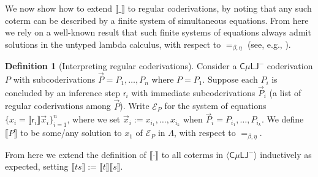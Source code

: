 \documentclass[10pt,a4paper]{amsart}
\theoremstyle{plain}
\newtheorem{lemma}[lemma]{Lemma}
\theoremstyle{definition}
\newtheorem{definition}[definition]{Definition}
\newcommand{\dfn}{:=}
\newcommand{\red}[1]{{\color{red}#1}}
\newcommand{\todonew}[1]{{\red{TodoNew: #1}}}
\renewcommand{\todonew}[1]{}
\theoremstyle{plain}
\theoremstyle{definition} %
\newcommand{\sem}[1]{\llbracket {#1} \rrbracket}
\newcommand{\closure}[1]{\langle #1 \rangle}
\newcommand{\Sys}[1]{\mathcal E_{#1}}
\newcommand{\infrule}{\mathsf{r}}
\newcommand{\rrule}{\infrule} %
\newcommand{\LJ}{\mathsf{LJ}}
\newcommand{\muLJ}{\mu\LJ}
\newcommand{\circular}{\mathsf C}
\newcommand{\cmuLJ}{\circular\muLJ}
\newcommand{\cmuLJneg}{\cmuLJ^-}
\newcommand{\rewrite}{\rightsquigarrow}
\newcommand{\reductionnorec}{\mathrm{r}'}
\newcommand{\reducesnorec}{\rewrite_{\reductionnorec}}
\newcommand{\betaeta}{=_{\beta, \eta}}
\newcommand{\der}{P}
\begin{document}
 We now show how to extend  $\sem{\_}$ to regular coderivations, by noting that any such coterm can be described by a finite system of simultaneous equations. 
 From here we rely on a well-known result that such finite systems of equations always admit solutions in the untyped lambda calculus, with respect to $\betaeta$ (see, e.g., \cite{Hindley}).

 \begin{definition}
 [Interpreting regular coderivations]
     Consider a $\cmuLJneg$ coderivation $P$ with subcoderivations $\vec P = P_1, \dots , P_n$ where $P = P_1$.
 Suppose each $P_i$ is concluded by an inference step $\rrule_i$ with immediate subcoderivations $\vec P_i$ (a list of regular coderivations among $\vec P$).
 Write $\Sys \der$ for the system of equations $\{x_i = \sem{\rrule_i} \vec x_i\}_{i=1}^n$, where we set $\vec x_i \dfn x_{i_1}, \dots, x_{i_k}$ when $\vec P_i = P_{i_1},\dots, P_{i_k}$.
% 
We define $\sem P$ to be some/any solution to $x_1$ of $\Sys P$ in $\Lambda$, with respect to $\betaeta$.

 From here we extend the definition of $\sem\cdot $ to all coterms in $\closure \cmuLJneg$ inductively as expected, setting $\sem{ts}\dfn \sem t \sem s$.
 \end{definition}

\todonew{A: I just inlined the actual equations into a definition above and skipped the intermediate lemma here. I've glossed over the narrative too.}

 
\end{document}
